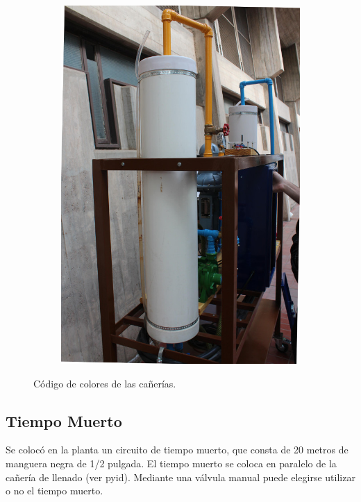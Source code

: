 \begin{figure}[ht]
\begin{subfigure}[b]{0.36\textwidth}
\includegraphics[width=\textwidth]{Cap2-DisenoEnsamblado/images/caneria2.JPG}
        \end{subfigure}
        \caption{Código de colores de las cañerías.}
        \label{fig:canerias}
\end{figure}

\subsection{Tiempo Muerto}
\label{subsec:tiempoMuerto}
Se colocó en la planta un circuito de tiempo muerto, que consta de 20 metros de
manguera negra de 1/2 pulgada.
El tiempo muerto se coloca en paralelo de la cañería de llenado (ver
\gls{pyid}).
Mediante una válvula manual puede elegirse utilizar o no el tiempo muerto.

